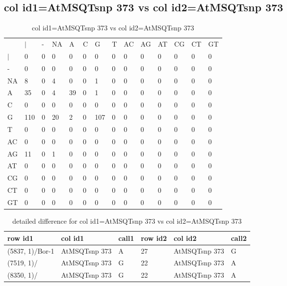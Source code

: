 \subsection{col id1=AtMSQTsnp 373 vs col id2=AtMSQTsnp 373}
\begin{center}
\begin{longtable}{|l|l|l|l|l|l|l|l|l|l|l|l|l|l|}
\caption{col id1=AtMSQTsnp 373 vs col id2=AtMSQTsnp 373} \label{table_dm892}\\
\hline
\\
\hline
&$|$&-&NA&A&C&G&T&AC&AG&AT&CG&CT&GT\\
$|$&0&0&0&0&0&0&0&0&0&0&0&0&0\\
-&0&0&0&0&0&0&0&0&0&0&0&0&0\\
NA&8&0&4&0&0&1&0&0&0&0&0&0&0\\
A&35&0&4&39&0&1&0&0&0&0&0&0&0\\
C&0&0&0&0&0&0&0&0&0&0&0&0&0\\
G&110&0&20&2&0&107&0&0&0&0&0&0&0\\
T&0&0&0&0&0&0&0&0&0&0&0&0&0\\
AC&0&0&0&0&0&0&0&0&0&0&0&0&0\\
AG&11&0&1&0&0&0&0&0&0&0&0&0&0\\
AT&0&0&0&0&0&0&0&0&0&0&0&0&0\\
CG&0&0&0&0&0&0&0&0&0&0&0&0&0\\
CT&0&0&0&0&0&0&0&0&0&0&0&0&0\\
GT&0&0&0&0&0&0&0&0&0&0&0&0&0\\
\hline
\end{longtable}
\end{center}

\begin{center}
\begin{longtable}{|l|l|l|l|l|l|}
\caption{detailed difference for col id1=AtMSQTsnp 373 vs col id2=AtMSQTsnp 373} \label{table_dm893}\\
\hline
row id1&col id1&call1&row id2&col id2&call2\\
\hline
(5837, 1)/Bor-1&AtMSQTsnp 373&A&27&AtMSQTsnp 373&G\\
(7519, 1)/&AtMSQTsnp 373&G&22&AtMSQTsnp 373&A\\
(8350, 1)/&AtMSQTsnp 373&G&22&AtMSQTsnp 373&A\\
\hline
\end{longtable}
\end{center}

